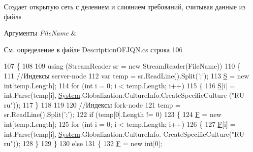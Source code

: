 Создает открытую сеть с делением и слиянием требований, считывая данные из файла 


\begin{DoxyParams}{Аргументы}
{\em File\+Name} & \\
\hline
\end{DoxyParams}


См. определение в файле Description\+O\+F\+J\+Q\+N.\+cs строка 106


\begin{DoxyCode}
107         \{
108 
109             \textcolor{keyword}{using} (StreamReader sr = \textcolor{keyword}{new} StreamReader(FileName))
110             \{
111                 \textcolor{comment}{//Индексы server-node}
112                 var temp = sr.ReadLine().Split(\textcolor{charliteral}{';'});
113                 \hyperlink{class_network_descriptions_1_1_description_o_f_j_q_n_a31744a17bac05c3e10a7e958ad3fdb0c}{S} = \textcolor{keyword}{new} \textcolor{keywordtype}{int}[temp.Length];
114                 \textcolor{keywordflow}{for} (\textcolor{keywordtype}{int} i = 0; i < temp.Length; i++)
115                 \{
116                     \hyperlink{class_network_descriptions_1_1_description_o_f_j_q_n_a31744a17bac05c3e10a7e958ad3fdb0c}{S}[i] = \textcolor{keywordtype}{int}.Parse(temp[i], \hyperlink{namespace_system}{System}.Globalization.CultureInfo.CreateSpecificCulture
      (\textcolor{stringliteral}{"RU-ru"}));
117                 \}
118 
119 
120                 \textcolor{comment}{//Индексы fork-node}
121                 temp = sr.ReadLine().Split(\textcolor{charliteral}{';'});
122                 \textcolor{keywordflow}{if} (temp[0].Length != 0)
123                 \{
124                     \hyperlink{class_network_descriptions_1_1_description_o_f_j_q_n_aaadbe1cc3f0bdb0bef593d2b732c988f}{F} = \textcolor{keyword}{new} \textcolor{keywordtype}{int}[temp.Length];
125                     \textcolor{keywordflow}{for} (\textcolor{keywordtype}{int} i = 0; i < temp.Length; i++)
126                     \{
127                         \hyperlink{class_network_descriptions_1_1_description_o_f_j_q_n_aaadbe1cc3f0bdb0bef593d2b732c988f}{F}[i] = \textcolor{keywordtype}{int}.Parse(temp[i], \hyperlink{namespace_system}{System}.Globalization.CultureInfo.
      CreateSpecificCulture(\textcolor{stringliteral}{"RU-ru"}));
128                     \}
129                 \}
130                 \textcolor{keywordflow}{else}
131                 \{
132                     \hyperlink{class_network_descriptions_1_1_description_o_f_j_q_n_aaadbe1cc3f0bdb0bef593d2b732c988f}{F} = \textcolor{keyword}{new} \textcolor{keywordtype}{int}[0];

\end{DoxyCode}
